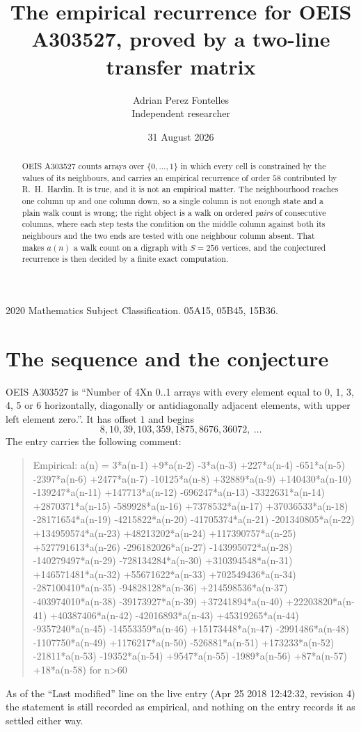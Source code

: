 \documentclass[11pt,a4paper]{article}
\title{The empirical recurrence for OEIS A303527, proved by a two-line transfer matrix}
\author{Adrian Perez Fontelles\\ \small Independent researcher}
\date{31 August 2026}
\theoremstyle{plain}
\theoremstyle{definition}
\begin{document}
\maketitle

\begin{abstract}
OEIS A303527 counts arrays over $\{0,\dots,1\}$ in which every cell is constrained by the
values of its neighbours, and carries an empirical recurrence of order $58$ contributed
by R.~H.~Hardin. It is true, and it is not an empirical matter. The neighbourhood reaches one
column up and one column down, so a single column is not enough state and a plain walk count
is wrong; the right object is a walk on ordered \emph{pairs} of consecutive columns, where
each step tests the condition on the middle column against both its neighbours and the two
ends are tested with one neighbour column absent. That makes $a(n)$ a walk count on a digraph
with $S=256$ vertices, and the conjectured recurrence is then decided by a finite exact
computation.
\end{abstract}

\noindent\small 2020 Mathematics Subject Classification. 05A15, 05B45, 15B36.\normalsize

\section{The sequence and the conjecture}

OEIS A303527 is ``Number of 4Xn 0..1 arrays with every element equal to 0, 1, 3, 4, 5 or 6 horizontally, diagonally or antidiagonally adjacent elements, with upper left element zero.''. It has offset $1$ and begins
\[
8, 10, 39, 103, 359, 1875, 8676, 36072,\ \dots
\]
The entry carries the following comment:
\begin{quote}\small
Empirical: a(n) = 3*a(n-1) +9*a(n-2) -3*a(n-3) +227*a(n-4) -651*a(n-5) -2397*a(n-6) +2477*a(n-7) -10125*a(n-8) +32889*a(n-9) +140430*a(n-10) -139247*a(n-11) +147713*a(n-12) -696247*a(n-13) -3322631*a(n-14) +2870371*a(n-15) -589928*a(n-16) +7378532*a(n-17) +37036533*a(n-18) -28171654*a(n-19) -4215822*a(n-20) -41705374*a(n-21) -201340805*a(n-22) +134959574*a(n-23) +48213202*a(n-24) +117390757*a(n-25) +527791613*a(n-26) -296182026*a(n-27) -143995072*a(n-28) -140279497*a(n-29) -728134284*a(n-30) +310394548*a(n-31) +146571481*a(n-32) +55671622*a(n-33) +702549436*a(n-34) -287100410*a(n-35) -94828128*a(n-36) +214598536*a(n-37) -403974010*a(n-38) -39173927*a(n-39) +37241894*a(n-40) +22203820*a(n-41) +40387406*a(n-42) -42016893*a(n-43) +45319265*a(n-44) -9357240*a(n-45) -14553359*a(n-46) +15173448*a(n-47) -2991486*a(n-48) -1107750*a(n-49) +1176217*a(n-50) -526881*a(n-51) +173233*a(n-52) -21811*a(n-53) -19352*a(n-54) +9547*a(n-55) -1989*a(n-56) +87*a(n-57) +18*a(n-58) for n>60
\end{quote}
As of the ``Last modified'' line on the live entry (Apr 25 2018 12:42:32, revision 4) the statement is
still recorded as empirical, and nothing on the entry records it as settled either way.
\end{document}
